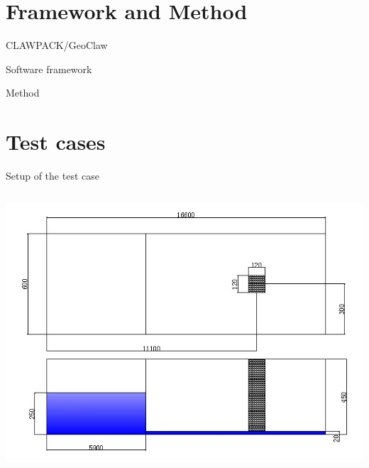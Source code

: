 \documentclass[xcolor=dvipsnames]{beamer}
\begin{document}
\section{Framework and Method}
\label{sec-4}
\begin{frame}[label=sec-4-1]{CLAWPACK/GeoClaw}
\begin{block}{Software framework}
\end{block}
\begin{block}{Method}
\end{block}
\end{frame}

\section{Test cases}
\label{sec-5}
\begin{frame}[label=sec-5-1]{Setup of the test case}
\begin{columns}
\begin{column}{1.0\textwidth}
\begin{block}{}
\includegraphics[width=.9\linewidth]{../proposal/figures/Diagram_case.jpg} \\
\end{block}
\end{column}
\end{columns}
\end{frame}
\end{document}
